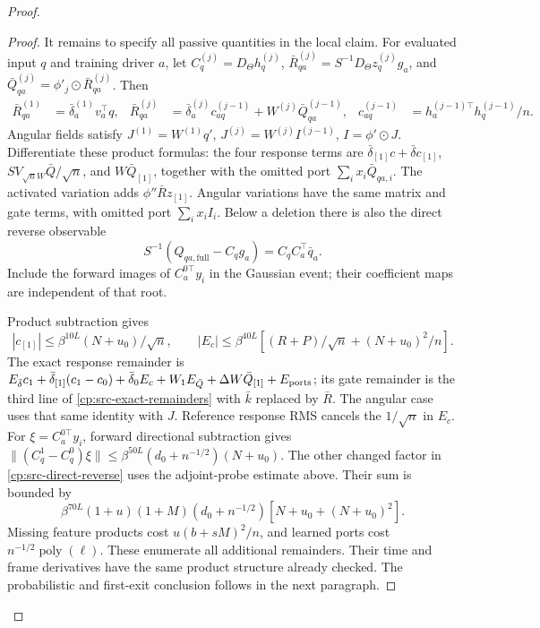 \begin{proof}
\begin{proof}
It remains to specify all passive quantities in the local claim.
For evaluated input \(q\) and training driver \(a\), let
\(C_q^{(j)}=D_\Theta h_q^{(j)}\),
\(\bar R_{qa}^{(j)}=S^{-1}D_\Theta z_q^{(j)}g_a\), and
\(\bar Q_{qa}^{(j)}=\phi'_j\odot\bar R_{qa}^{(j)}\).  Then
\begin{align}
 \bar R_{qa}^{(1)}&=\bar\delta_a^{(1)}v_a^\top q,&
 \bar R_{qa}^{(j)}&=\bar\delta_a^{(j)}c_{aq}^{(j-1)}
                         +W^{(j)}\bar Q_{qa}^{(j-1)},&
 c_{aq}^{(j-1)}&=h_a^{(j-1)\top}h_q^{(j-1)}/n.\label{cp:src-response-recursion}
\end{align}
Angular fields satisfy \(J^{(1)}=W^{(1)}q'\),
\(J^{(j)}=W^{(j)}I^{(j-1)}\), \(I=\phi'\odot J\).
Differentiate these product formulas: the four response terms are
\(\bar\delta_{[1]}c+\bar\delta c_{[1]}\),
\(SV_{\sqrt nW}\bar Q/\sqrt n\), and
\(W\bar Q_{[1]}\), together with the omitted port
\(\sum_ix_i\bar Q_{qa,i}\).  The activated variation adds
\(\phi''\bar R z_{[1]}\).  Angular variations have the same
matrix and gate terms, with omitted port \(\sum_ix_iI_i\).
Below a deletion there is also the direct reverse observable
\begin{equation}
 S^{-1}(Q_{qa,\mathrm{full}}-C_qg_a)=C_qC_a^\top\bar q_a.
 \label{cp:src-direct-reverse}
\end{equation}
Include the forward images of \(C_a^{0\top}y_i\) in the Gaussian
event; their coefficient maps are independent of that root.

Product subtraction gives
\[
 |c_{[1]}|\le\beta^{10L}(N+u_0)/\sqrt n,\qquad
 |E_c|\le\beta^{40L}[(R+P)/\sqrt n+(N+u_0)^2/n].
\]
The exact response remainder is
\(E_{\bar\delta}c_1+\bar\delta_{[1]}(c_1-c_0)
+\bar\delta_0E_c+W_1E_{\bar Q}+\Delta W\bar Q_{[1]}
+E_{\rm ports}\); its gate remainder is the third line of
\eqref{cp:src-exact-remainders} with \(\bar k\) replaced by
\(\bar R\).  The angular case uses that same identity with \(J\).
Reference response RMS cancels the \(1/\sqrt n\) in \(E_c\).
For \(\xi=C_a^{0\top}y_i\), forward directional subtraction gives
\(\|(C_q^1-C_q^0)\xi\|\le
\beta^{50L}(d_0+n^{-1/2})(N+u_0)\).
The other changed factor in \eqref{cp:src-direct-reverse} uses the
adjoint-probe estimate above.  Their sum is bounded by
\[
 \beta^{70L}(1+u)(1+M)(d_0+n^{-1/2})
                       [N+u_0+(N+u_0)^2].
\]
Missing feature products cost \(u(b+sM)^2/n\), and learned ports
cost \(n^{-1/2}\operatorname{poly}(\ell)\).  These enumerate all
additional remainders.  Their time and frame derivatives have the
same product structure already checked.  The probabilistic and
first-exit conclusion follows in the next paragraph.
\end{proof}


\end{proof}
